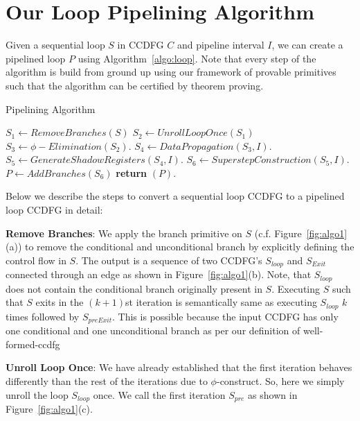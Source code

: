 \section{Our Loop Pipelining Algorithm}
Given a sequential loop $S$ in CCDFG $C$ and pipeline interval $I$, we can create a pipelined loop $P$ using Algorithm~\ref{algo:loop}. Note that every step of the algorithm is build from ground up using our framework of provable primitives such that the algorithm can be certified by theorem proving.

\begin{algorithm}[H]
\caption{Pipelining Algorithm}
\label{algo:loop}
\begin{algorithmic}[1]
\State $S_1 \leftarrow RemoveBranches(S)$
\State $S_2 \leftarrow UnrollLoopOnce(S_1)$
\State $S_3 \leftarrow \phi-Elimination (S_2) $.
\State $S_4 \leftarrow DataPropagation (S_3, I) $.
\State $S_5 \leftarrow GenerateShadowRegisters (S_4, I) $.
\State $ S_6 \leftarrow SuperstepConstruction (S_5, I) $.
\State $P \leftarrow AddBranches (S_6) $
\State \textbf{return} $(P)$.
\EndProcedure
\end{algorithmic}
\end{algorithm}

Below we describe the steps to convert a sequential loop CCDFG to a pipelined loop CCDFG in detail:
 
{\bf Remove Branches}: We apply the branch primitive on $S$ (c.f. Figure~\ref{fig:algo1}(a)) to remove the conditional and unconditional branch by explicitly defining the control flow in $S$. The output is a sequence of two CCDFG's $S_{loop}$ and $S_{Exit}$ connected through an edge as shown in Figure~\ref{fig:algo1}(b).
Note, that $S_{loop}$ does not contain the conditional branch originally present in $S$.
Executing $S$ such that $S$ exits in the $(k+1)$st iteration is semantically same as executing $S_{loop}$ $k$ times
followed by $S_{preExit}$. This is possible because the input CCDFG has only one conditional and one unconditional branch as per our definition of well-formed-ccdfg 

{\bf Unroll Loop Once}: We have already established that the first iteration behaves differently than the rest of the
iterations due to $\phi$-construct. So, here we simply unroll the loop $S_{loop}$ once. We call the first iteration
$S_{pre}$ as shown in Figure~\ref{fig:algo1}(c).

